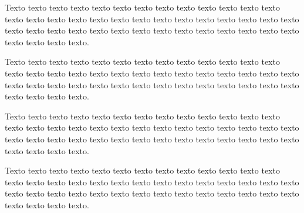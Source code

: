 	\begin{figure}[h!]
		\centering
	\end{figure}

    Texto texto texto texto texto texto texto texto texto texto texto texto texto texto texto texto texto texto texto texto texto texto texto texto texto texto texto texto texto texto texto texto texto texto texto texto texto texto texto texto texto texto texto texto texto.

    Texto texto texto texto texto texto texto texto texto texto texto texto texto texto texto texto texto texto texto texto texto texto texto texto texto texto texto texto texto texto texto texto texto texto texto texto texto texto texto texto texto texto texto texto texto.

    Texto texto texto texto texto texto texto texto texto texto texto texto texto texto texto texto texto texto texto texto texto texto texto texto texto texto texto texto texto texto texto texto texto texto texto texto texto texto texto texto texto texto texto texto texto.

    Texto texto texto texto texto texto texto texto texto texto texto texto texto texto texto texto texto texto texto texto texto texto texto texto texto texto texto texto texto texto texto texto texto texto texto texto texto texto texto texto texto texto texto texto texto.

